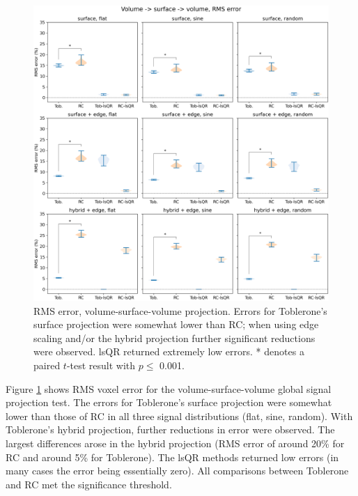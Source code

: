 \documentclass[12pt]{report}
\begin{document}
\begin{figure}[H]
\centering
\includegraphics[width=\textwidth]{VSV_violins}
\caption{RMS error, volume-surface-volume projection. Errors for Toblerone's surface projection were somewhat lower than RC; when using edge scaling and/or the hybrid projection further significant reductions were observed. lsQR returned extremely low errors. * denotes a paired $t$-test result with $p\leq $ 0.001.}
\label{VSV_rms} 
\end{figure}

Figure \ref{VSV_rms} shows RMS voxel error for the volume-surface-volume global signal projection test. The errors for Toblerone's surface projection were somewhat lower than those of RC in all three signal distributions (flat, sine, random). With Toblerone's hybrid projection, further reductions in error were observed. The largest differences arose in the hybrid projection (RMS error of around 20\% for RC and around 5\% for Toblerone). The lsQR methods returned low errors (in many cases the error being essentially zero). All comparisons  between Toblerone and RC met the significance threshold. 
\end{document}

